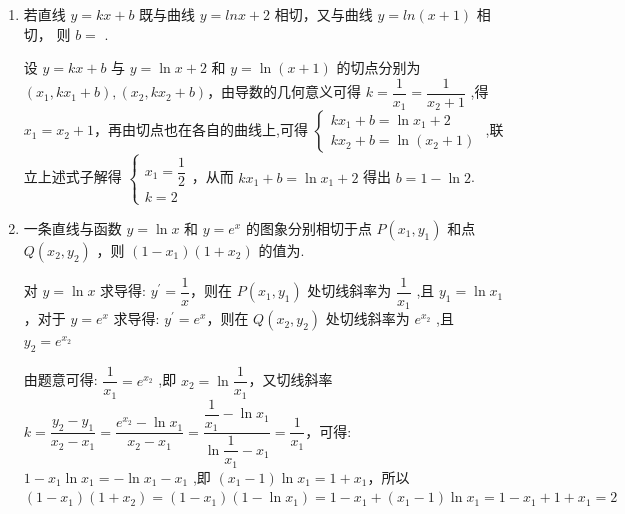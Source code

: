 \begin{enumerate}
    \item 若直线 $y = {kx} + b$ 既与曲线 $y = {lnx} + 2$ 相切，又与曲线 $y = {{ln}\left( {x + 1}\right) }$ 相切， 则 $b =$ .
    \begin{jieda}
        设 $y = {kx} + b$ 与 $y = \ln x + 2$ 和 $y = \ln \left( {x + 1}\right)$ 的切点分别为 $\left( {{x}_{1},k{x}_{1} + b}\right) ,\left( {{x}_{2},k{x}_{2} + b}\right)$，由导数的几何意义可得 $k = \dfrac{1}{{x}_{1}} = \dfrac{1}{{x}_{2} + 1}$ ,得 ${x}_{1} = {x}_{2} + 1$，再由切点也在各自的曲线上,可得 $\left\{  \begin{array}{l} k{x}_{1} + b = \ln {x}_{1} + 2 \\  k{x}_{2} + b = \ln \left( {{x}_{2} + 1}\right)  \end{array}\right.$ ,联立上述式子解得 $\left\{  \begin{array}{l} {x}_{1} = \dfrac{1}{2} \\  k = 2 \end{array}\right.$，从而 $k{x}_{1} + b = \ln {x}_{1} + 2$ 得出 $b = 1 - \ln 2$.
    \end{jieda}

    \item 一条直线与函数 $y = \ln x$ 和 $y = {{e}}^{x}$ 的图象分别相切于点 $P\left( {{x}_{1},{y}_{1}}\right)$ 和点 $Q\left( {{x}_{2},{y}_{2}}\right)$ ，则 $\left( {1 - {x}_{1}}\right) \left( {1 + {x}_{2}}\right)$ 的值为.
    \begin{jieda}
        对 $y = \ln x$ 求导得: ${y}^{\prime } = \dfrac{1}{x}$，则在 $P\left( {{x}_{1},{y}_{1}}\right)$ 处切线斜率为 $\dfrac{1}{{x}_{1}}$ ,且 ${y}_{1} = \ln {x}_{1}$，对于 $y = {{e}}^{x}$ 求导得: ${y}^{\prime } = {{e}}^{x}$，则在 $Q\left( {{x}_{2},{y}_{2}}\right)$ 处切线斜率为 ${{e}}^{{x}_{2}}$ ,且 ${y}_{2} = {{e}}^{{x}_{2}}$
        
        由题意可得: $\dfrac{1}{{x}_{1}} = {{e}}^{{x}_{2}}$ ,即 ${x}_{2} = \ln \dfrac{1}{{x}_{1}}$，又切线斜率 $k = \dfrac{{y}_{2} - {y}_{1}}{{x}_{2} - {x}_{1}} = \dfrac{{{e}}^{{x}_{2}} - \ln {x}_{1}}{{x}_{2} - {x}_{1}} = \dfrac{\dfrac{1}{{x}_{1}} - \ln {x}_{1}}{\ln \dfrac{1}{{x}_{1}} - {x}_{1}} = \dfrac{1}{{x}_{1}}$，可得: $1 - {x}_{1}\ln {x}_{1} =  - \ln {x}_{1} - {x}_{1}$ ,即 $\left( {{x}_{1} - 1}\right) \ln {x}_{1} = 1 + {x}_{1}$，所以 $\left( {1 - {x}_{1}}\right) \left( {1 + {x}_{2}}\right)  = \left( {1 - {x}_{1}}\right) \left( {1 - \ln {x}_{1}}\right)  = 1 - {x}_{1} + \left( {{x}_{1} - 1}\right) \ln {x}_{1} = 1 - {x}_{1} + 1 + {x}_{1} = 2$
    \end{jieda}


\end{enumerate}
